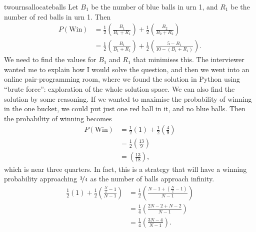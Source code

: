 \begin{answer}{twournsallocateballs}
Let $B_1$ be the number of blue balls in urn 1, and
$R_1$ be the number of red balls in urn 1.
Then
\begin{equation}
\label{eq:urns:crux}
\begin{aligned}
 P(\text{Win})
 &=
  \frac{1}{2}
  \left(
  \frac{B_1}{B_1 + R_1}
  \right)
  +
  \frac{1}{2}
  \left(
  \frac{B_2}{B_2 + R_2}
  \right)
  \\
 &=
  \frac{1}{2}
  \left(
  \frac{B_1}{B_1 + R_1}
  \right)
  +
  \frac{1}{2}
  \left(
  \frac{5 - B_1}{10 - (B_1 +R_1)}
  \right)
  \text{.}
\end{aligned}
\end{equation}
We need to find the values for $B_1$ and $R_1$ that minimises this.
The interviewer wanted me to explain how I would solve the question, and then we went into an online pair-programming room, where we found the solution in Python using ``brute force'': exploration of the whole solution space.
We can also find the solution by some reasoning.
If we wanted to maximise the probability of winning in the one bucket, we could put just one red ball in it, and no blue balls.
Then the probability of winning becomes
\begin{equation*}
\begin{aligned}
 P(\text{Win})
 &=
  \frac{1}{2}
  \left(
  1
  \right)
  +
  \frac{1}{2}
  \left(
  \frac{4}{9}
  \right)
  \\
 &=
  \frac{1}{2}
  \left(
  \frac{13}{9}
  \right)
  \\
 &=
  \left(
  \frac{13}{18}
  \right)
  \text{,}
\end{aligned}
\end{equation*}
which is near three quarters. In fact, this is a strategy that will have a winning probability approaching $\nicefrac{3}{4}$ as the number of balls approach infinity.
\begin{align*}
  \frac{1}{2}
  \left(
  1
  \right)
  +
  \frac{1}{2}
  \left(
  \frac{\frac{N}{2} - 1}{N - 1}
  \right)
  &=
  \frac{1}{2}
  \left(
  \frac{ N-1 + \left( \frac{N}{2} - 1 \right) }{N - 1}
  \right)
  \\
  &=
  \frac{1}{4}
  \left(
  \frac{ 2N-2 +  N - 2  }{N - 1}
  \right)
  \\
  &=
  \frac{1}{4}
  \left(
  \frac{ 3N - 4  }{N - 1}
  \right)
  \text{.}
\end{align*}


\end{answer}
